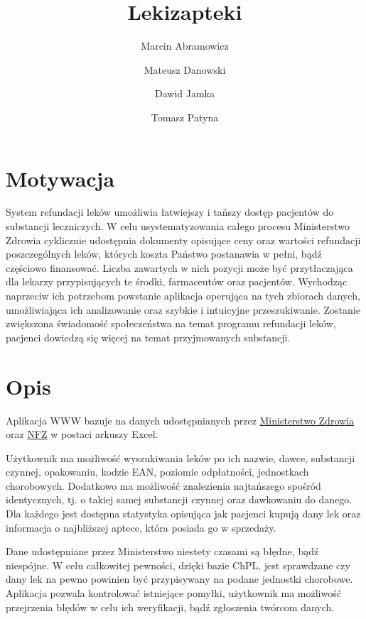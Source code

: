 \documentclass{article}
\title{Lekizapteki}
\author{Marcin Abramowicz \and Mateusz Danowski \and Dawid Jamka \and Tomasz Patyna}
\begin{document}
  \maketitle


  \section{Motywacja}

  System refundacji leków umożliwia łatwiejszy i tańszy dostęp pacjentów do substancji leczniczych.
  W celu usystematyzowania całego procesu Ministerstwo Zdrowia cyklicznie udostępnia dokumenty opisujące ceny oraz wartości refundacji poszczególnych leków, których koszta Państwo postanawia w pełni, bądź częściowo finansować.
  Liczba zawartych w nich pozycji może być przytłaczająca dla lekarzy przypisujących te środki, farmaceutów oraz pacjentów.
  Wychodząc naprzeciw ich potrzebom powstanie aplikacja operująca na tych zbiorach danych, umożliwiająca ich analizowanie oraz szybkie i intuicyjne przeszukiwanie.
  Zostanie zwiększona świadomość społeczeństwa na temat programu refundacji leków, pacjenci dowiedzą się więcej na temat przyjmowanych substancji.


  \section{Opis}

  Aplikacja WWW bazuje na danych udostępnianych przez
  \href{https://www.gov.pl/web/zdrowie/obwieszczenia-ministra-zdrowia-lista-lekow-refundowanych?fbclid=IwAR1U3YB3yON5EN2s1qdYRbcIeh7iDxqeOtQoEYGFvX9ozGDWdURIK2JOMRs}
  {Ministerstwo Zdrowia}
  oraz \href{https://www.nfz.gov.pl/aktualnosci/aktualnosci-centrali/komunikat-dgl,7465.html?fbclid=IwAR0F41XjLwTg7XQdUjeYpE_KS4VVZk50etlbYDpwxhxOR2ZLdslMatUtbEU}{NFZ}
  w postaci arkuszy Excel.

  Użytkownik ma możliwość wyszukiwania leków po ich nazwie, dawce, substancji czynnej, opakowaniu, kodzie EAN, poziomie odpłatności, jednostkach chorobowych.
  Dodatkowo ma możliwość znalezienia najtańszego spośród identycznych, tj. o takiej samej substancji czynnej oraz dawkowaniu do danego.
  Dla każdego jest dostępna statystyka opisująca jak pacjenci kupują dany lek oraz informacja o najbliższej aptece, która posiada go w sprzedaży.

  Dane udostępniane przez Ministerstwo niestety czasami są błędne, bądź niespójne.
  W celu całkowitej pewności, dzięki bazie ChPL, jest sprawdzane czy dany lek na pewno powinien być przypisywany na podane jednostki chorobowe.
  Aplikacja pozwala kontrolować istniejące pomyłki, użytkownik ma możliwość przejrzenia błędów w celu ich weryfikacji, bądź zgłoszenia twórcom danych.
\end{document}

